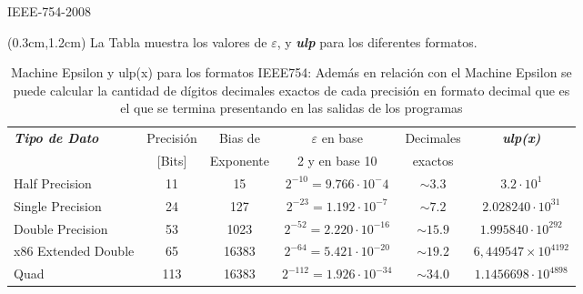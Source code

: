 \documentclass[usenames,table,dvipsnames,aspectratio=169]{beamer}
\begin{document}
\begin{frame}{IEEE-754-2008}
 \begin{textblock*}{\textwidth}(0.3cm,1.2cm)%
  La Tabla muestra los valores de $\varepsilon$,  y \textbf{\textit{ulp}} para los diferentes formatos.
  \begin{table}[h]
   \begin{center}
    \begin{footnotesize}
     \begin{tabular}{||l|c|c|c|c|c||}
\hline\hline
\textbf{\textit{Tipo de Dato}} & Precisión &  Bias de  & $\varepsilon$ en base &  Decimales &\textbf{\textit{ulp(x)}}\\
                               &  [Bits]   & Exponente & 2 y en base 10 &  exactos   &\\
\hline\hline
Half Precision & 11 & 15 & $2^{-10} = 9.766\cdot10^-4$ & $\sim3.3$ & $3.2\cdot10^{1}$\\ \hline
Single Precision & 24 & 127 & $2^{-23} = 1.192\cdot10^{-7} $ & $\sim 7.2$ & $2.028240\cdot10^{31}$\\ \hline
Double Precision & 53 & 1023 & $2^{-52} = 2.220\cdot10^{-16} $ & $\sim15.9$ & $1.995840\cdot10^{292}$\\ \hline
x86 Extended Double& 65 & 16383 & $2^{-64} = 5.421\cdot10^{-20}$ & $\sim19.2$ & $6,449547×10^{4192}$\\ \hline
Quad & 113 & 16383 & $2^{-112} = 1.926\cdot10^{-34}$ & $\sim34.0$ & $1.1456698\cdot10^{4898}$\\
\hline\hline
     \end{tabular}
    \end{footnotesize}
   \end{center}
   \caption{Machine Epsilon y ulp(x) para los formatos IEEE754: Además en relación con el Machine Epsilon se puede calcular la cantidad de dígitos decimales exactos de cada precisión en formato decimal que es el que se termina presentando en las salidas de los programas}
   \label{tbl:epsilons}
  \end{table}
 \end{textblock*}
\end{frame}
\end{document}
